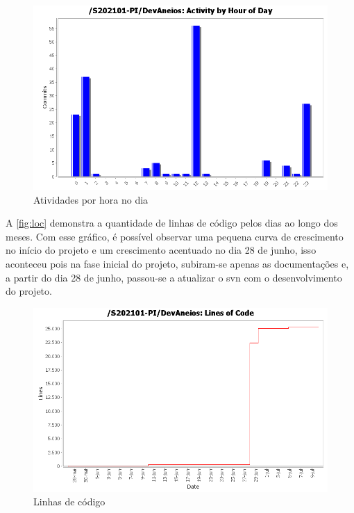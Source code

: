 \begin{figure}[htb]
    \centering
	\includegraphics[width=16cm]{imagens/activity_time.png}
	\caption{\label{fig:time} Atividades por hora no dia}
\end{figure}
\FloatBarrier

A \autoref{fig:loc} demonstra a quantidade de linhas de código pelos dias ao longo dos meses. Com esse gráfico, é possível observar uma pequena curva de crescimento no início do projeto e um crescimento acentuado no dia 28 de junho, isso aconteceu pois na fase inicial do projeto, subiram-se apenas as documentações e, a partir do dia 28 de junho, passou-se a atualizar o \gls{svn} com o desenvolvimento do projeto.

\begin{figure}[htb]
    \centering
	\includegraphics[width=16cm]{imagens/loc.png}
	\caption{\label{fig:loc} Linhas de código}
\end{figure}
\FloatBarrier

